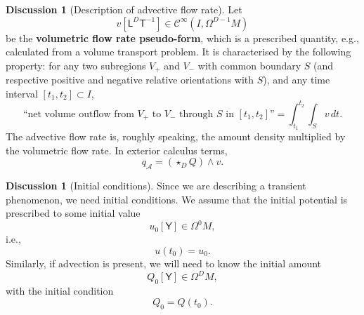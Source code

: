 \documentclass{elsarticle}
\theoremstyle{definition}
\newtheorem{discussion}[theorem]{Discussion}
\newcommand{\newterm}[1]{\textbf{#1}}
\newcommand{\potential}{\mathsf{Y}}
\newcommand{\length}{\mathsf{L}}
\renewcommand{\time}{\mathsf{T}}
\newcommand{\advective}{\mathcal{A}}
\begin{document}
\begin{discussion}[Description of advective flow rate]
  Let
  \begin{equation}
    \label{eq:continuum/volumetric_flow_rate_definition}
    v [\length^D \time^{-1}] \in \mathcal{C}^\infty(I, \Omega^{D - 1} M)
  \end{equation}
  be the \newterm{volumetric flow rate pseudo-form}, which is a prescribed quantity, e.g., calculated from a volume transport problem.
  It is characterised by the following property: for any two subregions $V_{+}$ and $V_{-}$ with common boundary $S$ (and respective positive and negative relative orientations with $S$), and any time interval $[t_1, t_2] \subset I$,
  \begin{equation}
    \label{eq:continuum/volumetric_flow_rate_formula}
    \textrm{``net volume outflow from $V_{+}$ to $V_{-}$ through $S$ in $[t_1, t_2]$''} = \int_{t_1}^{t_2} \int_S v\, d t.
  \end{equation}
  The advective flow rate is, roughly speaking, the amount density multiplied by the volumetric flow rate.
  In exterior calculus terms,
  \begin{equation}
    \label{eq:continuum/advective_flow_rate_formula}
    q_{\advective} = (\star_D Q) \wedge v.
  \end{equation}
\end{discussion}
\begin{discussion}[Initial conditions]
  Since we are describing a transient phenomenon, we need initial conditions.
  We assume that the initial potential is prescribed to some initial value
  \begin{equation}
    \label{eq:continuum/initial_potential_definition}
    u_0 [\potential] \in \Omega^0 M,
  \end{equation}
  i.e.,
  \begin{equation}
    \label{eq:continuum/initial_condition_potential}
    u(t_0) = u_0.
  \end{equation}
  Similarly, if advection is present, we will need to know the initial amount
  \begin{equation}
    \label{eq:continuum/initial_amount_definition}
    Q_0 [\potential] \in \Omega^D M,
  \end{equation}
  with the initial condition
  \begin{equation}
    \label{eq:continuum/initial_condition_amount}
    Q_0 = Q(t_0).
  \end{equation}
\end{discussion}
\end{document}
